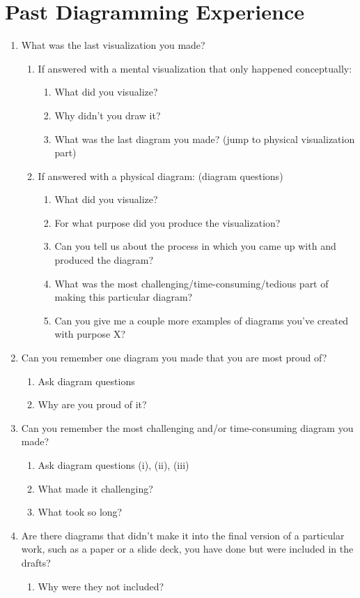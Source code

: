 \section{Past Diagramming Experience}
\begin{enumerate}
    \item What was the last visualization you made?
    \begin{enumerate}
        \item If answered with a mental visualization that only happened conceptually:
        \begin{enumerate}
            \item What did you visualize?
            \item Why didn't you draw it?
            \item What was the last diagram you made? (jump to physical visualization part)
        \end{enumerate}
        \item If answered with a physical diagram: (diagram questions)
        \begin{enumerate}
            \item What did you visualize?
            \item For what purpose did you produce the visualization?
            \item Can you tell us about the process in which you came up with and produced the diagram?
            \item What was the most challenging/time-consuming/tedious part of making this particular diagram?
            \item Can you give me a couple more examples of diagrams you've created with purpose X?
        \end{enumerate}
    \end{enumerate}
    \item Can you remember one diagram you made that you are most proud of?
    \begin{enumerate}
        \item Ask diagram questions
        \item Why are you proud of it?
    \end{enumerate}
    \item Can you remember the most challenging and/or time-consuming diagram you made?
    \begin{enumerate}
        \item Ask diagram questions (i), (ii), (iii)
        \item What made it challenging?
        \item What took so long?
    \end{enumerate}
    \item Are there diagrams that didn't make it into the final version of a particular work, such as a paper or a slide deck, you have done but were included in the drafts?
    \begin{enumerate}
        \item Why were they not included?
    \end{enumerate}
\end{enumerate}

